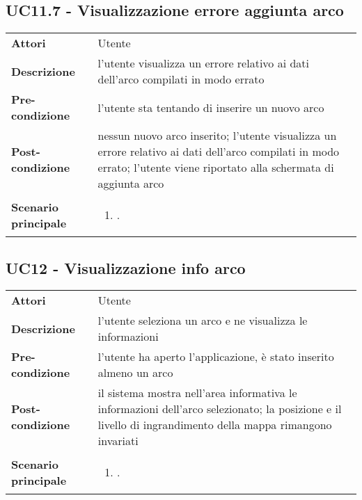 \subsection{UC11.7 - Visualizzazione errore aggiunta arco} 
\label{sssec:UC11.7} 
\def\arraystretch{1.5}
\begin{tabularx}{\textwidth}{l|p{}}
	\rowcolor{I} \multicolumn{2}{c}{\color{white}\textbf{UC11.7 - Visualizzazione errore aggiunta arco}} \\
	\toprule
	\endhead
	\textbf{Attori} & Utente\\
	\textbf{Descrizione} & l'utente visualizza un errore relativo ai dati dell'arco compilati in modo errato\\
	\textbf{Pre-condizione} & l'utente sta tentando di inserire un nuovo arco\\
	\textbf{Post-condizione} & nessun nuovo arco inserito; l'utente visualizza un errore relativo ai dati dell'arco compilati in modo errato; l'utente viene riportato alla schermata di aggiunta arco\\
	\textbf{Scenario principale} & \vspace{-1.2em}\begin{enumerate}[leftmargin=*,noitemsep,nosep]
		\item \nameref{sssec:UC11.7}.
	\end{enumerate}\\
	\bottomrule
\end{tabularx}
\subsection{UC12 - Visualizzazione info arco} 
\label{sssec:UC12} 
\def\arraystretch{1.5}
\begin{tabularx}{\textwidth}{l|p{}}
	\rowcolor{I} \multicolumn{2}{c}{\color{white}\textbf{UC12 - Visualizzazione info arco}} \\
	\toprule
	\endhead
	\textbf{Attori} & Utente\\
	\textbf{Descrizione} & l'utente seleziona un arco e ne visualizza le informazioni\\
	\textbf{Pre-condizione} & l'utente ha aperto l'applicazione, è stato inserito almeno un arco\\
	\textbf{Post-condizione} & il sistema mostra nell'area informativa le informazioni dell'arco selezionato; la posizione e il livello di ingrandimento della mappa rimangono invariati\\
	\textbf{Scenario principale} & \vspace{-1.2em}\begin{enumerate}[leftmargin=*,noitemsep,nosep]
		\item \nameref{sssec:UC12}.
	\end{enumerate}\\
	\bottomrule
\end{tabularx}

